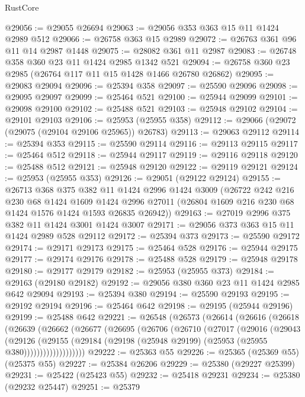 \begin{lexlean}{RustCore}
\begin{coremodule}
@29056 := @29055 @26694
@29063 := @29056 @353 @363 @15 @11 @1424 @2989 @512
@29066 := @26758 @363 @15 @2989
@29072 := @26763 @361 @96 @11 @14 @2987 @1448
@29075 := @28082 @361 @11 @2987
@29083 := @26748 @358 @360 @23 @11 @1424 @2985 @1342 @521
@29094 := @26758 @360 @23 @2985 (@26764 @117 @11 @15 @1428 @1466 @26780 @26862)
@29095 := @29083 @29094
@29096 := @25394 @358
@29097 := @25590 @29096
@29098 := @29095 @29097
@29099 := @25464 @521
@29100 := @25944 @29099
@29101 := @29098 @29100
@29102 := @25488 @521
@29103 := @25948 @29102
@29104 := @29101 @29103
@29106 := @25953 (@25955 @358)
@29112 := @29066 (@29072 (@29075 (@29104 @29106 @25965)) @26783)
@29113 := @29063 @29112
@29114 := @25394 @353
@29115 := @25590 @29114
@29116 := @29113 @29115
@29117 := @25464 @512
@29118 := @25944 @29117
@29119 := @29116 @29118
@29120 := @25488 @512
@29121 := @25948 @29120
@29122 := @29119 @29121
@29124 := @25953 (@25955 @353)
@29126 := @29051 (@29122 @29124)
@29155 := @26713
    @368
    @375
    @382
    @11
    @1424
    @2996
    @1424
    @3009
    (@26722
      @242
      @216
      @230
      @68
      @1424
      @1609
      @1424
      @2996
      @27011
      (@26804 @1609 @216 @230 @68 @1424 @1576 @1424 @1593 @26835 @26942))
@29163 := @27019 @2996 @375 @382 @11 @1424 @3001 @1424 @3007
@29171 := @29056 @373 @363 @15 @11 @1424 @2989 @528 @29112
@29172 := @25394 @373
@29173 := @25590 @29172
@29174 := @29171 @29173
@29175 := @25464 @528
@29176 := @25944 @29175
@29177 := @29174 @29176
@29178 := @25488 @528
@29179 := @25948 @29178
@29180 := @29177 @29179
@29182 := @25953 (@25955 @373)
@29184 := @29163 (@29180 @29182)
@29192 := @29056 @380 @360 @23 @11 @1424 @2985 @642 @29094
@29193 := @25394 @380
@29194 := @25590 @29193
@29195 := @29192 @29194
@29196 := @25464 @642
@29198 := @29195 (@25944 @29196)
@29199 := @25488 @642
@29221 := @26548
    (@26573
      (@26614
        (@26616
          (@26618
            (@26639
              (@26662
                (@26677
                  (@26695
                    (@26706
                      (@26710
                        (@27017
                          (@29016
                            (@29043
                              (@29126
                                (@29155
                                  (@29184
                                    (@29198 (@25948 @29199) (@25953 (@25955 @380)))))))))))))))))))
@29222 := @25363 @55
@29226 := @25365 (@25369 @55) (@25375 @55)
@29227 := @25384 @26206
@29229 := @25380 (@29227 @25399)
@29231 := @25422 (@25423 @55)
@29232 := @25418 @29231
@29234 := @25380 (@29232 @25447)
@29251 := @25379

\end{coremodule}
\end{lexlean}
